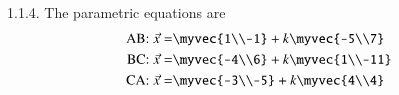 \documentclass[journal,12pt,twocolumn]{IEEEtran}
\begin{document}



\vspace{3cm}

1.1.4.	The parametric equations are
\begin{align}
\text{AB: } \vec{x} = &\myvec{1\\-1} + k \myvec{-5\\7}\\
\text{BC: } \vec{x} = &\myvec{-4\\6} + k \myvec{1\\-11}\\
\text{CA: } \vec{x} = &\myvec{-3\\-5} + k \myvec{4\\4} 
\end{align}
\end{document}
